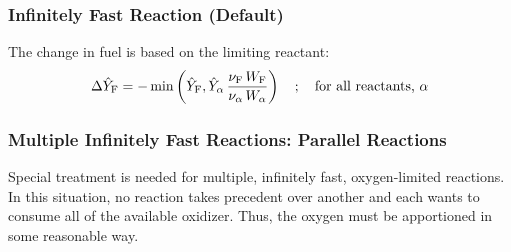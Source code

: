 %
%

\subsubsection{Infinitely Fast Reaction (Default)}


The change in fuel is based on the limiting reactant:
\begin{equation}\label{eq:stoich_fuel_single}
\Delta \hat{Y}_{\rm F} = - \min \left( \hat{Y}_{\rm F}, \hat{Y}_{\alpha} \,\frac{\nu_{\rm F}\,W_{\rm F}}{\nu_{\alpha}\,W_{\alpha}}\right) \quad ; \quad \mbox{for all reactants, $\alpha$}
\end{equation}

\subsubsection{Multiple Infinitely Fast Reactions: Parallel Reactions}

Special treatment is needed for multiple, infinitely fast, oxygen-limited reactions. In this situation, no reaction takes precedent over another and each wants to consume all of the available oxidizer.  Thus, the oxygen must be apportioned in some reasonable way.

